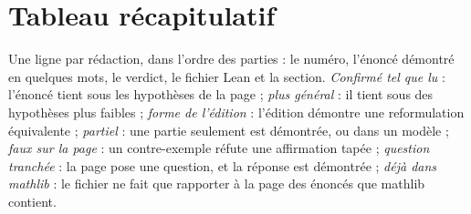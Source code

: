 \documentclass[11pt]{article}
\theoremstyle{plain}
\theoremstyle{definition}
\theoremstyle{plain}
\theoremstyle{definition}
\theoremstyle{remark}
\renewcommand{\_}{\bkunderscore\allowbreak}
\begin{document}
\section*{Tableau récapitulatif}

Une ligne par rédaction, dans l'ordre des parties : le numéro, l'énoncé démontré en quelques mots, le verdict, le fichier Lean et la section. \emph{Confirmé tel que lu} : l'énoncé tient sous les hypothèses de la page ; \emph{plus général} : il tient sous des hypothèses plus faibles ; \emph{forme de l'édition} : l'édition démontre une reformulation équivalente ; \emph{partiel} : une partie seulement est démontrée, ou dans un modèle ; \emph{faux sur la page} : un contre-exemple réfute une affirmation tapée ; \emph{question tranchée} : la page pose une question, et la réponse est démontrée ; \emph{déjà dans mathlib} : le fichier ne fait que rapporter à la page des énoncés que mathlib contient.
\end{document}
